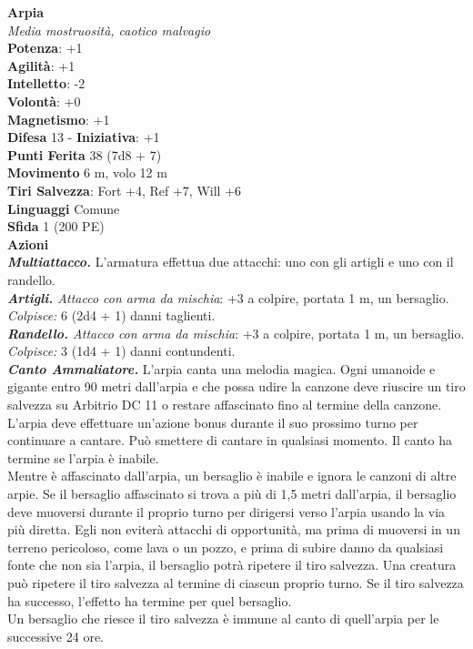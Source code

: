 \begin{multicols}{2}
\medskip\textbf{Arpia}\\
\emph{Media mostruosità, caotico malvagio}\\
\textbf{Potenza}: +1\\
\textbf{Agilità}: +1\\
\textbf{Intelletto}: -2\\
\textbf{Volontà}: +0\\
\textbf{Magnetismo}: +1\\
\textbf{Difesa} 13 - \textbf{Iniziativa}: +1\\
\textbf{Punti Ferita} 38 (7d8 + 7)\\
\textbf{Movimento} 6 m, volo 12 m\\
\textbf{Tiri Salvezza}: Fort +4, Ref +7, Will +6\\
\textbf{Linguaggi} Comune\\
\textbf{Sfida} 1 (200 PE)\smallskip\\
\smallskip\textbf{Azioni}\\
\emph{\textbf{Multiattacco.}} L'armatura effettua due attacchi: uno con gli artigli e uno con il randello.\\
\emph{\textbf{Artigli.} Attacco con arma da mischia}: +3 a colpire, portata 1 m, un bersaglio.\\
\emph{Colpisce:} 6 (2d4 + 1) danni taglienti.\\
\emph{\textbf{Randello.} Attacco con arma da mischia}: +3 a colpire, portata 1 m, un bersaglio.\\
\emph{Colpisce:} 3 (1d4 + 1) danni contundenti.\\
\emph{\textbf{Canto Ammaliatore.}} L'arpia canta una melodia magica. Ogni umanoide e gigante entro 90 metri dall'arpia e che possa udire la canzone deve riuscire un tiro salvezza su Arbitrio DC 11 o restare affascinato fino al termine della canzone. L'arpia deve effettuare un'azione bonus durante il suo prossimo turno per continuare a cantare. Può smettere di cantare in qualsiasi momento. Il canto ha termine se l'arpia è inabile.\\
Mentre è affascinato dall'arpia, un bersaglio è inabile e ignora le canzoni di altre arpie. Se il bersaglio affascinato si trova a più di 1,5 metri dall'arpia, il bersaglio deve muoversi durante il proprio turno per dirigersi verso l'arpia usando la via più diretta. Egli non eviterà attacchi di opportunità, ma prima di muoversi in un terreno pericoloso, come lava o un pozzo, e prima di subire danno da qualsiasi fonte che non sia l'arpia, il bersaglio potrà ripetere il tiro salvezza. Una creatura può ripetere il tiro salvezza al termine di ciascun proprio turno. Se il tiro salvezza ha successo, l'effetto ha termine per quel bersaglio.\\
Un bersaglio che riesce il tiro salvezza è immune al canto di quell'arpia per le successive 24 ore.\\


\end{multicols}
